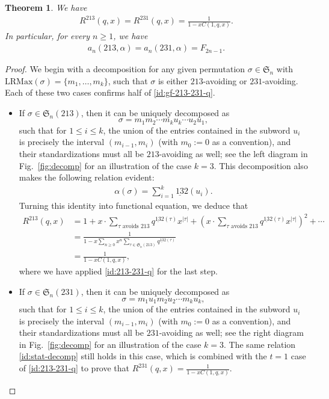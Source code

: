 \documentclass[12pt]{amsart}
\numberwithin{equation}{section}
\theoremstyle{plain}
\newtheorem{theorem}{Theorem}[section]
\def\fS{\mathfrak{S}}
\def\acb{\mathrm{\underline{13}2}}
\def\LRMax{\mathrm{LRMax}}
\begin{document}
\begin{theorem}\label{thm:213-231-q}
We have
\begin{align}\label{id:gf-213-231-q}
R^{213}(q,x)=R^{231}(q,x)=\frac{1}{1-xC(1,q,x)}.
\end{align}
In particular, for every $n\ge 1$, we have
\begin{align}\label{id:213-231-Fibo}
a_n(213,\alpha)=a_n(231,\alpha)=F_{2n-1}.
\end{align}
\end{theorem}

\begin{proof}
We begin with a decomposition for any given permutation $\sigma\in\fS_n$ with $\LRMax(\sigma)=\{m_1,\ldots,m_k\}$, such that $\sigma$ is either $213$-avoiding or $231$-avoiding. Each of these two cases confirms half of \eqref{id:gf-213-231-q}.
\begin{itemize}
	\item If $\sigma\in\fS_n(213)$, then it can be uniquely decomposed as
	$$\sigma=m_1m_2\cdots m_ku_k\cdots u_2u_1,$$
	such that for $1\le i\le k$, the union of the entries contained in the subword $u_i$ is precisely the interval $(m_{i-1},m_i)$ (with $m_0:=0$ as a convention), and their standardizations must all be $213$-avoiding as well; see the left diagram in Fig.~\ref{fig:decomp} for an illustration of the case $k=3$. This decomposition also makes the following relation evident:
	\begin{align}\label{id:stat-decomp}
	\alpha(\sigma)=\sum_{i=1}^{k}\acb(u_i).
	\end{align}
	Turning this identity into functional equation, we deduce that
	\begin{align*}
	R^{213}(q,x) &= 1+x\cdot \sum_{\tau \text{ avoids }213}q^{\acb(\tau)}x^{|\tau|}+\left(x\cdot \sum_{\tau \text{ avoids }213}q^{\acb(\tau)}x^{|\tau|}\right)^2+\cdots\\
	&=\frac{1}{1-x\sum_{n\ge 0}x^n\sum_{\tau\in\fS_n(213)}q^{\acb(\tau)}}\\
	&=\frac{1}{1-xC(1,q,x)},
	\end{align*}
	where we have applied \eqref{id:213-231-q} for the last step.
	\item If $\sigma\in\fS_n(231)$, then it can be uniquely decomposed as
	$$\sigma=m_1u_1m_2u_2\cdots m_ku_k,$$
	such that for $1\le i\le k$, the union of the entries contained in the subword $u_i$ is precisely the interval $(m_{i-1},m_i)$ (with $m_0:=0$ as a convention), and their standardizations must all be $231$-avoiding as well; see the right diagram in Fig.~\ref{fig:decomp} for an illustration of the case $k=3$. The same relation \eqref{id:stat-decomp} still holds in this case, which is combined with the $t=1$ case of \eqref{id:213-231-q} to prove that $R^{231}(q,x)=\frac{1}{1-xC(1,q,x)}$.
\end{itemize}


\end{proof}
\end{document}
